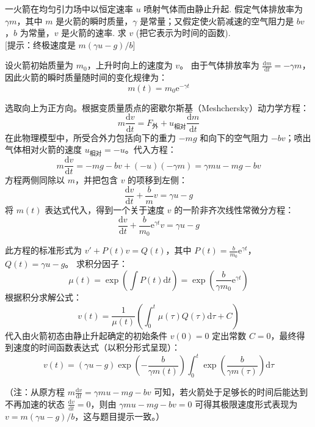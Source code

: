\begin{exercise}\label{ex:5.4}
一火箭在均匀引力场中以恒定速率 $u$ 喷射气体而由静止升起. 假定气体排放率为 $\gamma m$，其中 $m$ 是火箭的瞬时质量，$\gamma$ 是常量；又假定使火箭减速的空气阻力是 $bv$，$b$ 为常量，$v$ 是火箭的速率. 求 $v$ (把它表示为时间的函数).
\\[1ex]
[提示：终极速度是 $m(\gamma u - g)/b$]
\end{exercise}
\begin{solution}
设火箭初始质量为 $m_0$，上升时向上的速度为 $v$。
由于气体排放率为 $\frac{\mathrm{d}m}{\mathrm{d}t} = -\gamma m$，因此火箭的瞬时质量随时间的变化规律为：
$$ m(t) = m_0 \mathrm{e}^{-\gamma t} $$

选取向上为正方向。根据变质量质点的密歇尔斯基（Meshchersky）动力学方程：
$$ m \frac{\mathrm{d}v}{\mathrm{d}t} = F_{\text{外}} + u_{\text{相对}} \frac{\mathrm{d}m}{\mathrm{d}t} $$
在此物理模型中，所受合外力包括向下的重力 $-mg$ 和向下的空气阻力 $-bv$；喷出气体相对火箭的速度 $u_{\text{相对}} = -u$。代入方程：
$$ m \frac{\mathrm{d}v}{\mathrm{d}t} = -mg - bv + (-u)(-\gamma m) = \gamma m u - mg - bv $$
方程两侧同除以 $m$，并把包含 $v$ 的项移到左侧：
$$ \frac{\mathrm{d}v}{\mathrm{d}t} + \frac{b}{m} v = \gamma u - g $$
将 $m(t)$ 表达式代入，得到一个关于速度 $v$ 的一阶非齐次线性常微分方程：
$$ \frac{\mathrm{d}v}{\mathrm{d}t} + \frac{b}{m_0} \mathrm{e}^{\gamma t} v = \gamma u - g $$

此方程的标准形式为 $v' + P(t)v = Q(t)$，其中 $P(t) = \frac{b}{m_0} \mathrm{e}^{\gamma t}$，$Q(t) = \gamma u - g$。
求积分因子：
$$ \mu(t) = \exp \left( \int P(t) \mathrm{d}t \right) = \exp \left( \frac{b}{\gamma m_0} \mathrm{e}^{\gamma t} \right) $$
根据积分求解公式：
$$ v(t) = \frac{1}{\mu(t)} \left( \int_0^t \mu(\tau) Q(\tau) \mathrm{d}\tau + C \right) $$
代入由火箭初态由静止升起确定的初始条件 $v(0) = 0$ 定出常数 $C = 0$，最终得到速度的时间函数表达式（以积分形式呈现）：
$$ v(t) = (\gamma u - g) \exp \left( -\frac{b}{\gamma m(t)} \right) \int_0^t \exp \left( \frac{b}{\gamma m(\tau)} \right) \mathrm{d}\tau $$

（注：从原方程 $m \frac{\mathrm{d}v}{\mathrm{d}t} = \gamma m u - mg - bv$ 可知，若火箭处于足够长的时间后能达到不再加速的状态 $\frac{\mathrm{d}v}{\mathrm{d}t} = 0$，则由 $\gamma m u - mg - bv = 0$ 可得其极限速度形式表现为 $v = m(\gamma u - g)/b$，这与题目提示一致。）
\end{solution}

